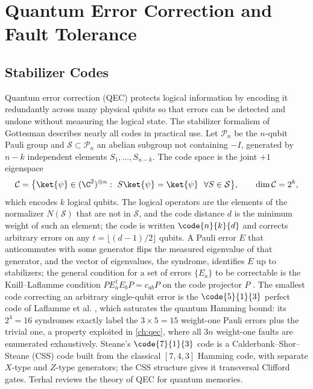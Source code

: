 \section{Quantum Error Correction and Fault Tolerance}\label{sec:bg:qec}

\subsection{Stabilizer Codes}

Quantum error correction (QEC) protects logical information by encoding it redundantly across many physical qubits so that errors can be detected and undone without measuring the logical state. The stabilizer formalism of Gottesman \cite{gottesman1997stabilizer} describes nearly all codes in practical use. Let $\mathcal{P}_n$ be the $n$-qubit Pauli group and $\mathcal{S}\subset\mathcal{P}_n$ an abelian subgroup not containing $-I$, generated by $n-k$ independent elements $S_1,\dots,S_{n-k}$. The code space is the joint $+1$ eigenspace
\begin{equation}\label{eq:bg:stabilizer}
\mathcal{C}=\bigl\{\ket{\psi}\in(\C^2)^{\otimes n}:\ S\ket{\psi}=\ket{\psi}\ \ \forall S\in\mathcal{S}\bigr\},\qquad \dim\mathcal{C}=2^{k},
\end{equation}
which encodes $k$ logical qubits. The logical operators are the elements of the normalizer $N(\mathcal{S})$ that are not in $\mathcal{S}$, and the code distance $d$ is the minimum weight of such an element; the code is written $\code{n}{k}{d}$ and corrects arbitrary errors on any $t=\lfloor(d-1)/2\rfloor$ qubits. A Pauli error $E$ that anticommutes with some generator flips the measured eigenvalue of that generator, and the vector of eigenvalues, the syndrome, identifies $E$ up to stabilizers; the general condition for a set of errors $\{E_a\}$ to be correctable is the Knill--Laflamme condition $PE_a^{\dagger}E_bP=c_{ab}P$ on the code projector $P$ \cite{knill1997theory}. The smallest code correcting an arbitrary single-qubit error is the $\code{5}{1}{3}$ perfect code of Laflamme et al. \cite{laflamme1996perfect}, which saturates the quantum Hamming bound: its $2^4=16$ syndromes exactly label the $3\times5=15$ weight-one Pauli errors plus the trivial one, a property exploited in \cref{ch:qec}, where all $3n$ weight-one faults are enumerated exhaustively. Steane's $\code{7}{1}{3}$ code \cite{steane1996codes} is a Calderbank--Shor--Steane (CSS) code \cite{calderbank1996goodcodes} built from the classical $[7,4,3]$ Hamming code, with separate $X$-type and $Z$-type generators; the CSS structure gives it transversal Clifford gates. Terhal \cite{terhal2015qecmemories} reviews the theory of QEC for quantum memories.

